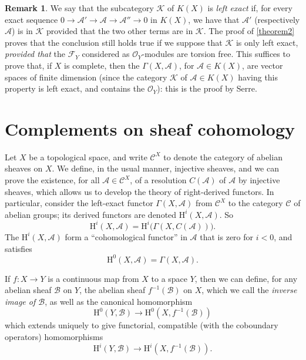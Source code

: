 \documentclass{article}
\theoremstyle{plain}
\theoremstyle{definition}
\newtheorem*{remark}{Remark}
\newcommand{\sh}[1]{{\mathscr{#1}}}
\newcommand{\cat}[1]{{\mathcal{#1}}}
\newcommand{\HH}{\mathrm{H}}
\newcommand{\oldpage}[1]{\marginpar{\footnotesize$\Big\vert$ \textit{p.~#1}}}
\begin{document}
\begin{remark}
  We say that the subcategory $\cat{K}$ of $K(X)$ is \emph{left exact} if, for every exact sequence $0\to\sh{A}'\to\sh{A}\to\sh{A}''\to0$ in $K(X)$, we have that $\sh{A}'$ (respectively $\sh{A}$) is in $\cat{K}$ provided that the two other terms are in $\cat{K}$.
  The proof of \cref{theorem2} proves that the conclusion still holds true if we suppose that $\cat{K}$ is only left exact, \emph{provided that} the $\sh{F}_Y$ considered as $\sh{O}_Y$-modules are torsion free.
  This suffices to prove that, if $X$ is complete, then the $\Gamma(X,\sh{A})$, for $\sh{A}\in K(X)$, are vector spaces of finite dimension (since the category $\cat{K}$ of $\sh{A}\in K(X)$ having this property is left exact, and contains the $\sh{O}_Y$): this is the proof by Serre.
\end{remark}


\section{Complements on sheaf cohomology}
\label{section3}

Let $X$ be a topological space, and write $\cat{C}^X$ to denote the category of abelian sheaves on $X$.
We define, in the usual manner, injective sheaves, and we can prove the existence, for all $\sh{A}\in\cat{C}^X$, of a resolution $C(\sh{A})$ of $\sh{A}$ by injective sheaves, which allows us to develop the theory of right-derived functors.
In particular, consider the left-exact functor $\Gamma(X,\sh{A})$
\oldpage{2-05}
from $\cat{C}^X$ to the category $\cat{C}$ of abelian groups;
its derived functors are denoted $\HH^i(X,\sh{A})$.
So
\[
  \HH^i(X,\sh{A}) = \HH^i\big(\Gamma(X,C(\sh{A}))\big).
\]
The $\HH^i(X,\sh{A})$ form a ``cohomological functor'' in $\sh{A}$ that is zero for $i<0$, and satisfies
\[
  \HH^0(X,\sh{A}) = \Gamma(X,\sh{A}).
\]

If $f\colon X\to Y$ is a continuous map from $X$ to a space $Y$, then we can define, for any abelian sheaf $\sh{B}$ on $Y$, the abelian sheaf $f^{-1}(\sh{B})$ on $X$, which we call the \emph{inverse image of $\sh{B}$}, as well as the canonical homomorphism
\[
  \HH^0(Y,\sh{B}) \to \HH^0(X,f^{-1}(\sh{B}))
\]
which extends uniquely to give functorial, compatible (with the coboundary operators) homomorphisms
\[
  \HH^i(Y,\sh{B}) \to \HH^i(X,f^{-1}(\sh{B})).
\]
\end{document}
